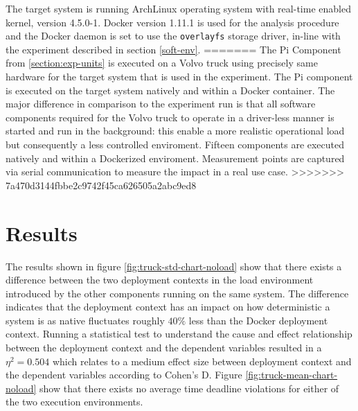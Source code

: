 The target system is running ArchLinux operating system with real-time enabled kernel, version 4.5.0-1. Docker version 1.11.1 is used for the analysis procedure and the Docker daemon is set to use the \texttt{overlayfs} storage driver, in-line with the experiment described in section \ref{soft-env}.
=======
The Pi Component from \ref{section:exp-units} is executed on a Volvo truck using precisely same hardware for the target system that is used in the experiment. The Pi component is executed on the target system natively and within a Docker container. The major difference in comparison to the experiment run is that all software components required for the Volvo truck to operate in a driver-less manner is started and run in the background: this enable a more realistic operational load but consequently a less controlled enviroment. Fifteen components are executed natively and within a Dockerized enviroment. Measurement points are captured via serial communication to measure the impact in a real use case. 
>>>>>>> 7a470d3144fbbe2c9742f45ca626505a2abc9ed8

\section{Results}

The results shown in figure \ref{fig:truck-std-chart-noload} show that there exists a difference between the two deployment contexts in the load environment introduced by the other components running on the same system. The difference indicates that the deployment context has an impact on how deterministic a system is as native fluctuates roughly $40\%$ less than the Docker deployment context. Running a statistical test to understand the cause and effect relationship between the deployment context and the dependent variables resulted in a $\eta^{2}=0.504$ which relates to a medium effect size between deployment context and the dependent variables according to Cohen's D. Figure \ref{fig:truck-mean-chart-noload} show that there exists no average time deadline violations for either of the two execution environments.



